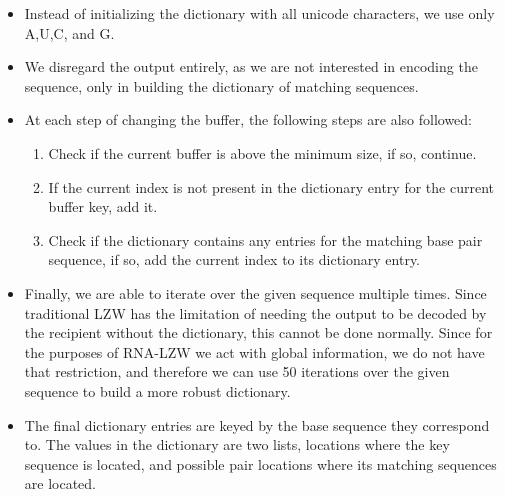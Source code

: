 \documentclass[sigconf]{acmart}
\begin{document}
\begin{itemize}
	\item Instead of initializing the dictionary with all unicode characters, we use only A,U,C, and G.
	\item We disregard the output entirely, as we are not interested in encoding the sequence, only in building the dictionary of matching sequences.
	\item At each step of changing the buffer, the following steps are also followed:
		\begin{enumerate}
			\item Check if the current buffer is above the minimum size, if so, continue.
			\item If the current index is not present in the dictionary entry for the current buffer key, add it.
			\item Check if the dictionary contains any entries for the matching base pair sequence, if so, add the current index to its dictionary entry.
		\end{enumerate}
	\item Finally, we are able to iterate over the given sequence multiple times. Since traditional LZW has the limitation of needing the output to be decoded by the recipient without the dictionary, this cannot be done normally. Since for the purposes of RNA-LZW we act with global information, we do not have that restriction, and therefore we can use 50 iterations over the given sequence to build a more robust dictionary.
	\item The final dictionary entries are keyed by the base sequence they correspond to. The values in the dictionary are two lists, locations where the key sequence is located, and possible pair locations where its matching sequences are located.

\end{itemize}
\end{document}
